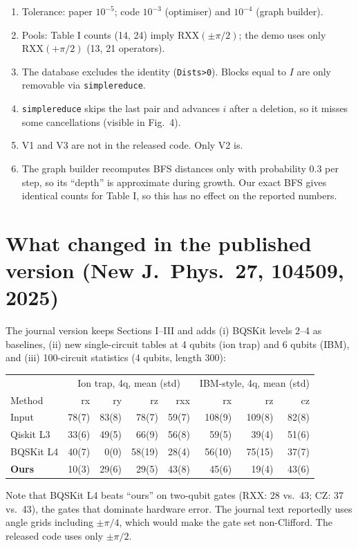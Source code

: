 \documentclass[11pt,a4paper]{article}
\newcommand{\RXX}{\mathrm{RXX}}\newcommand{\CZ}{\mathrm{CZ}}\newcommand{\CNOT}{\mathrm{CNOT}}
\begin{document}
\begin{careful}[title=Code vs.\ paper discrepancies]
\begin{enumerate}[nosep]
\item Tolerance: paper $10^{-5}$; code $10^{-3}$ (optimiser) and $10^{-4}$ (graph builder).
\item Pools: Table I counts (14, 24) imply $\RXX(\pm\pi/2)$; the demo uses only $\RXX(+\pi/2)$ (13, 21 operators).
\item The database excludes the identity (\texttt{Dists>0}). Blocks equal to $I$ are only removable via \texttt{simplereduce}.
\item \texttt{simplereduce} skips the last pair and advances $i$ after a deletion, so it misses some cancellations (visible in Fig.~4).
\item V1 and V3 are not in the released code. Only V2 is.
\item The graph builder recomputes BFS distances only with probability 0.3 per step, so its ``depth'' is approximate during
  growth. Our exact BFS gives identical counts for Table I, so this has no effect on the reported numbers.
\end{enumerate}
\end{careful}

\section{What changed in the published version (New J.\ Phys.\ 27, 104509, 2025)}
The journal version keeps Sections I--III and adds (i) BQSKit levels 2--4 as baselines, (ii) new single-circuit tables at
4 qubits (ion trap) and 6 qubits (IBM), and (iii) 100-circuit statistics (4 qubits, length 300):
\begin{center}\small
\begin{tabular}{lrrrr|rrr}\toprule
&\multicolumn{4}{c|}{Ion trap, 4q, mean (std)}&\multicolumn{3}{c}{IBM-style, 4q, mean (std)}\\
Method&rx&ry&rz&rxx&rx&rz&cz\\\midrule
Input&78(7)&83(8)&78(7)&59(7)&108(9)&109(8)&82(8)\\
Qiskit L3&33(6)&49(5)&66(9)&56(8)&59(5)&39(4)&51(6)\\
BQSKit L4&40(7)&0(0)&58(19)&28(4)&56(10)&75(15)&37(7)\\
\textbf{Ours}&10(3)&29(6)&29(5)&43(8)&45(6)&19(4)&43(6)\\\bottomrule
\end{tabular}
\end{center}
Note that BQSKit L4 beats ``ours'' on two-qubit gates ($\RXX$: 28 vs.\ 43; $\CZ$: 37 vs.\ 43), the gates that dominate
hardware error. The journal text reportedly uses angle grids including $\pm\pi/4$, which would make the gate set non-Clifford.
The released code uses only $\pm\pi/2$.
\end{document}
